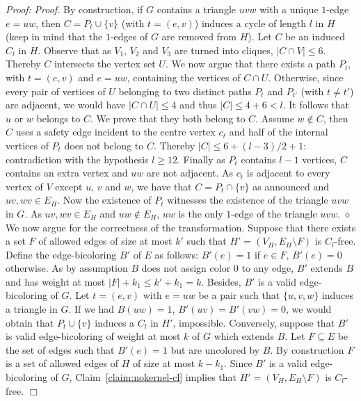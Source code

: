\documentclass[11pt]{article}
\newenvironment{proof}{\noindent\textit{Proof: }}{{\hfill $\Box$}}
\begin{document}
\begin{proof}
\emph{Proof.} By construction, if $G$ contains a triangle $uvw$ with a unique $1$-edge $e=uw$, then $C=P_t\cup\{v\}$ (with $t=(e,v)$) induces a cycle of length $l$ in $H$ (keep in mind that the $1$-edges of $G$ are removed from $H$).
Let $C$ be an induced $C_l$ in $H$. Observe that as $V_1$, $V_2$ and $V_3$ are turned into cliques, $|C\cap V|\leqslant 6$. Thereby $C$ intersects the vertex set $U$. We now argue that there exists a path $P_t$, with $t=(e,v)$ and $e=uw$, containing the vertices of $C\cap U$. Otherwise, since every pair of vertices of $U$ belonging to two distinct paths $P_t$ and $P_{t'}$ (with $t\neq t'$) are adjacent, we would have $|C\cap U|\leqslant 4$ and thus $|C|\leqslant 4+6<l$. It follows that $u$ or $w$ belongs to $C$. We prove that they both belong to $C$. Assume $w\notin C$, then $C$ uses a safety edge incident to the centre vertex $c_t$ and half of the internal vertices of $P_t$ does not belong to $C$. Thereby $|C|\leqslant 6+(l-3)/2+1$: contradiction with the hypothesis $l\geqslant 12$. Finally as $P_t$ contains $l-1$ vertices, $C$ contains an extra vertex and $uw$ are not adjacent. As $c_t$ is adjacent to every vertex of $V$ except $u$, $v$ and $w$, we have that $C=P_t\cap\{v\}$ as announced and $uv,wv\in E_H$. Now the existence of $P_t$ witnesses the existence of the triangle $uvw$ in $G$. As $uv,wv\in E_H$ and $uw\notin E_H$, $uw$ is the only $1$-edge of the triangle $uvw$.
\hfill $\diamond$ \\

We now argue for the correctness of the transformation. Suppose that there exists a set $F$ of allowed edges of size at most $k'$ such that $H'=(V_H,E_H\setminus F)$ is $C_l$-free. Define the edge-bicoloring $B'$ of $E$ as follows: $B'(e) = 1$ if $e \in F$, $B'(e) = 0$ otherwise. As by assumption $B$ does not assign color $0$ to any edge, $B'$ extends $B$ and has weight at most $|F|+k_1\leqslant k'+k_1=k$.
Besides, $B'$ is a valid edge-bicoloring of $G$. Let $t=(e,v)$ with $e=uw$ be a pair such that $\{u,v,w\}$ induces a triangle in $G$. If we had $B(uw) = 1$, $B'(uv)=B'(vw)=0$, we would obtain that $P_t\cup\{v\}$ induces a $C_l$ in $H'$, impossible. Conversely, suppose that $B'$ is valid edge-bicoloring of weight at most $k$ of $G$ which extends $B$. Let $F\subseteq E$ be the set of edges such that $B'(e)=1$ but are uncolored by $B$. By construction $F$ is a set of allowed edges of $H$ of size at most $k-k_1$. Since $B'$ is a valid edge-bicoloring of $G$, Claim~\ref{claim:nokernel-cl} implies that $H'=(V_H,E_H\setminus F)$ is $C_l$-free. 
 \end{proof}\\
 
\end{document}
